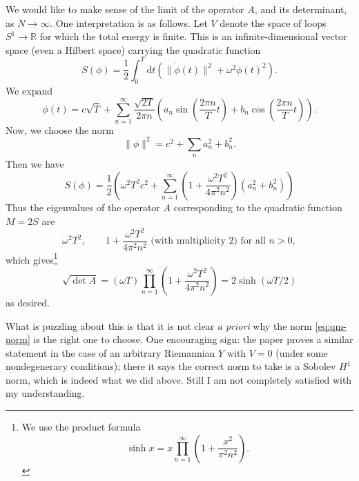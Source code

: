 \documentclass[12pt,letterpaper,reqno]{article}
\numberwithin{equation}{section}
\newcommand{\R}{\ensuremath{\mathbb R}}
\newcommand{\half}{\ensuremath{\frac{1}{2}}}
\newcommand{\de}{\mathrm{d}}
\newcommand{\norm}[1]{\lVert#1\rVert}
\newcommand{\ti}[1]{\textit{#1}}
\begin{document}
We would like to make sense of the limit of the operator $A$, and its determinant, as $N \to \infty$.
One interpretation is as follows.
Let $V$ denote the space of 
loops $S^1 \to \R$ for which the total energy is finite.
This is an infinite-dimensional vector space (even a Hilbert space)
carrying the quadratic function
\begin{equation}
  S(\phi) = \half \int_{0}^T \de t \left( \norm{\dot \phi(t)}^2 + \omega^2 \phi(t)^2 \right).
\end{equation}
We expand
\begin{equation}
  \phi(t) = c \sqrt{T} + \sum_{n=1}^\infty \frac{\sqrt{2T}}{2 \pi n} \left(a_n \sin\left(\frac{2 \pi n}{T} t\right) + b_n \cos\left(\frac{2 \pi n}{T} t\right)\right). 
\end{equation}
Now, we choose the norm
\begin{equation} \label{eq:qm-norm}
  \norm{\phi}^2 = c^2 + \sum_n a_n^2 + b_n^2.
\end{equation}
Then we have
\begin{equation}
  S(\phi) = \half \left( \omega^2 T^2 c^2 + \sum_{n=1}^\infty \left(1 +  \frac{\omega^2 T^2}{4 \pi^2 n^2} \right) (a_n^2 + b_n^2) \right)
\end{equation}
Thus the eigenvalues of the operator $A$ corresponding to the quadratic
function $M = 2S$ are
\begin{equation}
  \omega^2 T^2, \qquad 1 + \frac{\omega^2 T^2}{4 \pi^2 n^2} \text{ (with multiplicity $2$) for all $n > 0$},
\end{equation}
which gives\footnote{We use the product formula
\begin{equation}
  \sinh x = x \prod_{n=1}^\infty \left( 1 + \frac{x^2}{\pi^2 n^2} \right).
\end{equation}
}
\begin{equation}
  \sqrt{\det A} = (\omega T) \prod_{n=1}^\infty \left( 1 + \frac{\omega^2 T^2}{4 \pi^2 n^2} \right) = 2 \sinh (\omega T/2)  
\end{equation}
as desired.

What is puzzling about this is that it is not clear \ti{a priori} why the norm
\eqref{eq:qm-norm} is the right one to choose. One encouraging sign: the paper 
\cite{Ludewig2016} proves a similar statement in the case of an 
arbitrary Riemannian $Y$ with $V = 0$ (under some nondegeneracy conditions);
there it says the correct norm to take is a Sobolev $H^1$ norm, which is indeed
what we did above.
Still I am not completely satisfied with my understanding.
\end{document}
